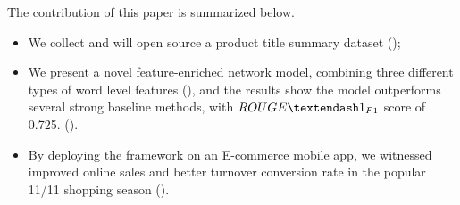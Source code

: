 The contribution of this paper is summarized below.
\begin{itemize}
	\itemsep0em
	\item We collect and will open source a product title summary 
dataset ();
	\item We present a novel feature-enriched network model, 
	combining three different types of word level features
	(), and the results 
	show the model outperforms 
	several strong baseline methods, with $ROUGE\textendash1_{F1}$ score of 
	0.725. (). 
	\item By deploying the framework on an E-commerce mobile app, 
	we witnessed improved online sales 
	and better turnover conversion rate
	in the popular 11/11 shopping season ().
\end{itemize}
